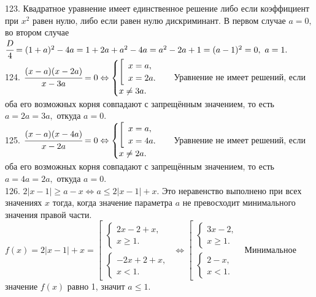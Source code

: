 123. Квадратное уравнение имеет единственное решение либо если коэффициент при $x^2$ равен нулю, либо если равен нулю дискриминант. В первом случае $a=0,$ во втором случае $\cfrac{D}{4}=(1+a)^2-4a=1+2a+a^2-4a=a^2-2a+1=(a-1)^2=0,\ a=1.$\\
124. $\cfrac{(x-a)(x-2a)}{x-3a}=0\Leftrightarrow \begin{cases} \left[\begin{array}{l} x=a,\\ x=2a.\end{array}\right.\\ x\neq 3a.\end{cases}$ Уравнение не имеет решений, если оба его возможных корня совпадают с запрещённым значением, то есть $a=2a=3a,$ откуда $a=0.$\\
125. $\cfrac{(x-a)(x-4a)}{x-2a}=0\Leftrightarrow \begin{cases} \left[\begin{array}{l} x=a,\\ x=4a.\end{array}\right.\\ x\neq 2a.\end{cases}$ Уравнение не имеет решений, если оба его возможных корня совпадают с запрещённым значением, то есть $a=4a=2a,$ откуда $a=0.$\\
126. $2|x-1|\geqslant a-x\Leftrightarrow a\leqslant  2|x-1|+x.$ Это неравенство выполнено при всех значениях $x$ тогда, когда значение параметра $a$ не превосходит минимального значения правой части. $f(x)=2|x-1|+x=\left[\begin{array}{l}\begin{cases}2x-2+x,\\ x\geqslant 1. \end{cases}\\ \begin{cases}-2x+2+x,\\ x< 1. \end{cases}\end{array}\right.\Leftrightarrow\left[\begin{array}{l}\begin{cases}3x-2,\\ x\geqslant 1. \end{cases}\\ \begin{cases}2-x,\\ x<1. \end{cases}\end{array}\right.$ Минимальное значение $f(x)$ равно 1, значит $a\leqslant1.$\\
